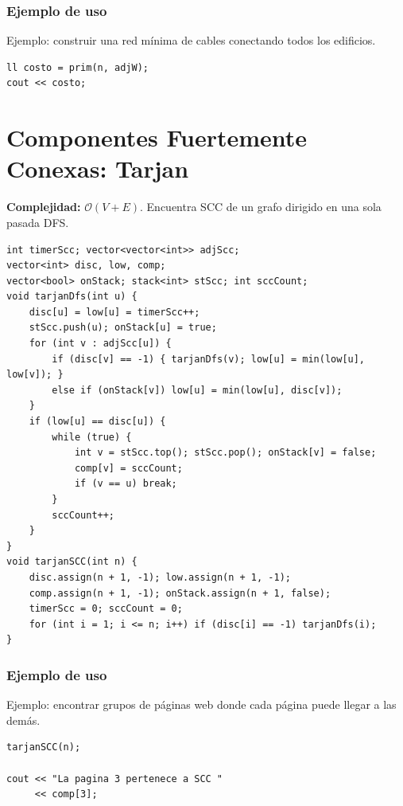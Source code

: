 \documentclass[10pt,twocolumn,letterpaper]{report}
\begin{document}
\subsubsection*{Ejemplo de uso}
Ejemplo: construir una red mínima de cables conectando todos los edificios.
\begin{lstlisting}
ll costo = prim(n, adjW);
cout << costo;
\end{lstlisting}


\section{Componentes Fuertemente Conexas: Tarjan}
\textbf{Complejidad:} $\mathcal{O}(V + E)$. Encuentra SCC de un grafo dirigido en una sola pasada DFS.
\begin{lstlisting}
int timerScc; vector<vector<int>> adjScc;
vector<int> disc, low, comp;
vector<bool> onStack; stack<int> stScc; int sccCount;
void tarjanDfs(int u) {
    disc[u] = low[u] = timerScc++;
    stScc.push(u); onStack[u] = true;
    for (int v : adjScc[u]) {
        if (disc[v] == -1) { tarjanDfs(v); low[u] = min(low[u], low[v]); }
        else if (onStack[v]) low[u] = min(low[u], disc[v]);
    }
    if (low[u] == disc[u]) {
        while (true) {
            int v = stScc.top(); stScc.pop(); onStack[v] = false;
            comp[v] = sccCount;
            if (v == u) break;
        }
        sccCount++;
    }
}
void tarjanSCC(int n) {
    disc.assign(n + 1, -1); low.assign(n + 1, -1);
    comp.assign(n + 1, -1); onStack.assign(n + 1, false);
    timerScc = 0; sccCount = 0;
    for (int i = 1; i <= n; i++) if (disc[i] == -1) tarjanDfs(i);
}
\end{lstlisting}
\subsubsection*{Ejemplo de uso}
Ejemplo: encontrar grupos de páginas web donde cada página puede llegar a las demás.
\begin{lstlisting}
tarjanSCC(n);

cout << "La pagina 3 pertenece a SCC "
     << comp[3];
\end{lstlisting}


\end{document}
